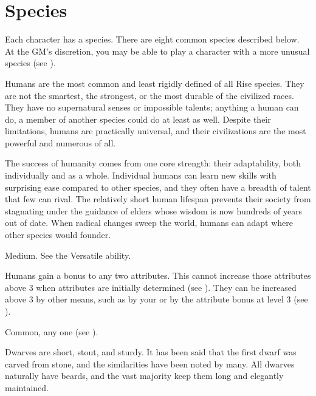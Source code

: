 \chapter{Species}\label{Species}
Each character has a species.
There are eight common species described below.
At the GM's discretion, you may be able to play a character with a more unusual species (see ).


  Humans are the most common and least rigidly defined of all Rise species.
  They are not the smartest, the strongest, or the most durable of the civilized races.
  They have no supernatural senses or impossible talents; anything a human can do, a member of another species could do at least as well.
  Despite their limitations, humans are practically universal, and their civilizations are the most powerful and numerous of all.

  The success of humanity comes from one core strength: their adaptability, both individually and as a whole.
  Individual humans can learn new skills with surprising ease compared to other species, and they often have a breadth of talent that few can rival.
  The relatively short human lifespan prevents their society from stagnating under the guidance of elders whose wisdom is now hundreds of years out of date.
  When radical changes sweep the world, humans can adapt where other species would founder.

   Medium.
   See the Versatile ability.
  \begin{raggeditemize}
     Humans gain a  bonus to any two attributes.
      This cannot increase those attributes above 3 when attributes are initially determined (see ).
      They can be increased above 3 by other means, such as by your  or by the attribute bonus at level 3 (see ).
  \end{raggeditemize}
   Common, any one  (see ).


  Dwarves are short, stout, and sturdy.
  It has been said that the first dwarf was carved from stone, and the similarities have been noted by many.
  All dwarves naturally have beards, and the vast majority keep them long and elegantly maintained.

